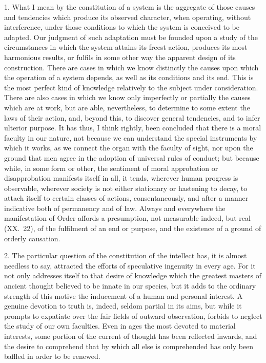 \documentclass[oneside]{book}
\begin{document}
1. What I mean by the constitution of a system is the
aggregate of those causes and tendencies which produce
its observed character, when operating, without interference,
under those conditions to which the system is conceived to be
adapted. Our judgment of such adaptation must be founded
upon a study of the circumstances in which the system attains its
freest action, produces its most harmonious results, or fulfils in
some other way the apparent design of its construction. There
are cases in which we know distinctly the causes upon which the
operation of a system depends, as well as its conditions and its
end. This is the most perfect kind of knowledge relatively to
the subject under consideration. There are also cases in which
we know only imperfectly or partially the causes which are at
work, but are able, nevertheless, to determine to some extent
the laws of their action, and, beyond this, to discover general
tendencies, and to infer ulterior purpose. It has thus, I think
rightly, been concluded that there is a moral faculty in our nature,
not because we can understand the special instruments by
which it works, as we connect the organ with the faculty of sight,
nor upon the ground that men agree in the adoption of universal
rules of conduct; but because while, in some form or other, the
sentiment of moral approbation or disapprobation manifests itself
in all, it tends, wherever human progress is observable, wherever
society is not either stationary or hastening to decay, to attach
itself to certain classes of actions, consentaneously, and after a
manner indicative both of permanency and of law. Always and
everywhere the manifestation of Order affords a presumption, not
measurable indeed, but real (XX.~22), of the fulfilment of an end
or purpose, and the existence of a ground of orderly causation.

2. The particular question of the constitution of the intellect
has, it is almost needless to say, attracted the efforts of speculative
ingenuity in every age. For it not only addresses itself to that
desire of knowledge which the greatest masters of ancient thought
believed to be innate in our species, but it adds to the ordinary
strength of this motive the inducement of a human and personal
interest. A genuine devotion to truth is, indeed, seldom partial
in its aims, but while it prompts to expatiate over the fair fields of
outward observation, forbids to neglect the study of our own faculties.
Even in ages the most devoted to material interests,
some portion of the current of thought has been reflected inwards,
and the desire to comprehend that by which all else is
comprehended has only been baffled in order to be renewed.
\end{document}
